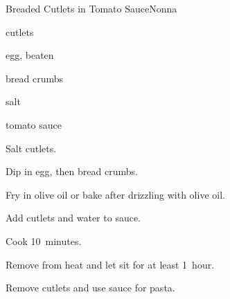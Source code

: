 \begin{recipe}{Breaded Cutlets in Tomato Sauce}{Nonna}{}

\begin{ingredients}
\item {} cutlets
\item egg, beaten
\item bread crumbs
\item salt
\item tomato sauce
\end{ingredients}

\begin{directions}
\item Salt cutlets.
\item Dip in egg, then bread crumbs.
\item Fry in olive oil or bake after drizzling with olive oil.
\item Add cutlets and  water to sauce.
\item Cook 10~minutes.
\item Remove from heat and let sit for at least 1~hour.
\item Remove cutlets and use sauce for pasta.
\end{directions}

\end{recipe}

